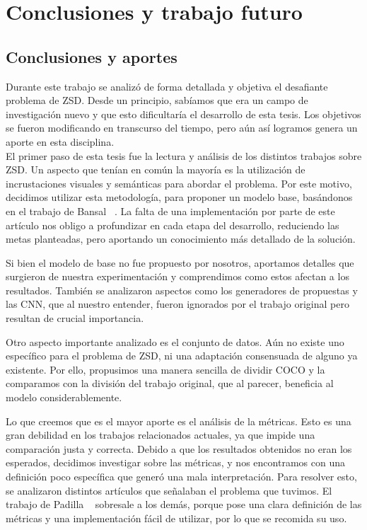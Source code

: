 \chapter{Conclusiones y trabajo futuro} \label{cap:conclusiones}

\section{Conclusiones y aportes} \label{sec:conclusionesyaportes}
Durante este trabajo se analizó de forma detallada y objetiva el desafiante problema de ZSD. Desde un principio, sabíamos que era un campo de investigación nuevo y que esto dificultaría el desarrollo de esta tesis. Los objetivos se fueron modificando en transcurso del tiempo, pero aún así logramos genera un aporte en esta disciplina.\\

El primer paso de esta tesis fue la lectura y análisis de los distintos trabajos sobre ZSD. Un aspecto que tenían en común la mayoría es la utilización de incrustaciones visuales y semánticas para abordar el problema. Por este motivo, decidimos utilizar esta metodología, para proponer un modelo base, basándonos en el trabajo de Bansal \etal~\cite{bansal2018zero}. La falta de una implementación por parte de este artículo nos obligo a profundizar en cada etapa del desarrollo, reduciendo las metas planteadas, pero aportando un conocimiento más detallado de la solución. 

Si bien el modelo de base no fue propuesto por nosotros, aportamos detalles que surgieron de nuestra experimentación y comprendimos como estos afectan a los resultados. También se analizaron aspectos como los generadores de propuestas y las CNN, que al nuestro entender, fueron ignorados por el trabajo original pero resultan de crucial importancia.

Otro aspecto importante analizado es el conjunto de datos. Aún no existe uno específico para el problema de ZSD, ni una adaptación consensuada de alguno ya existente. Por ello, propusimos una manera sencilla de dividir COCO y la comparamos con la división del trabajo original, que al parecer, beneficia al modelo considerablemente.

Lo que creemos que es el mayor aporte es el análisis de la métricas. Esto es una gran debilidad en los trabajos relacionados actuales, ya que impide una comparación justa y correcta. 
Debido a que los resultados obtenidos no eran los esperados, decidimos investigar sobre las métricas, y nos encontramos con una definición poco específica que generó una mala interpretación. Para resolver esto, se analizaron distintos artículos que señalaban el problema que tuvimos. El trabajo de Padilla \etal~\cite{padilla2020survey} sobresale a los demás, porque pose una clara definición de las métricas y una implementación fácil de utilizar, por lo que se recomida su uso.

